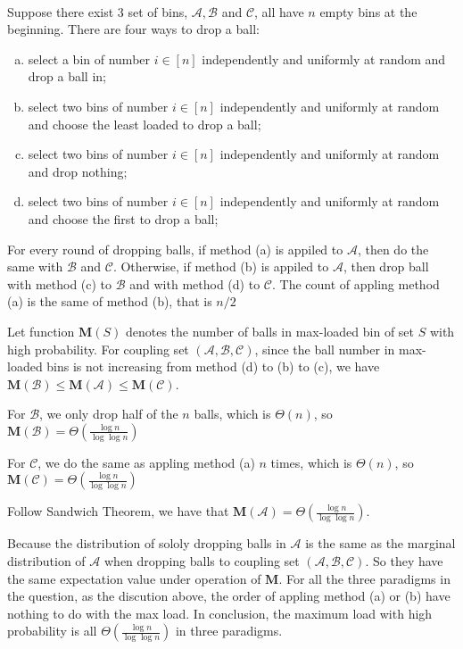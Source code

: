\documentclass[12pt]{article}
\newenvironment{solution}[2][Solution]{\begin{trivlist}
\item[\hskip \labelsep {\bfseries #1}\hskip \labelsep {\bfseries #2.}]}{\end{trivlist}}
\begin{document}
\begin{solution}{4}
    ~\\
    Suppose there exist 3 set of bins, $\mathcal{A}, \mathcal{B}$ and $\mathcal{C}$, all have $n$ empty bins at the beginning. There
    are four ways to drop a ball:
    \begin{enumerate}[(a)]
        \item select a bin of number $i \in [n]$ independently and uniformly at random and drop a ball in;
        \item select two bins of number $i \in [n]$ independently and uniformly at random and choose the least loaded to drop a ball;
        \item select two bins of number $i \in [n]$ independently and uniformly at random and drop nothing;
        \item select two bins of number $i \in [n]$ independently and uniformly at random and choose the first to drop a ball;
    \end{enumerate}

    For every round of dropping balls, if method (a) is appiled to $\mathcal{A}$, then do the same with $\mathcal{B}$ and $\mathcal{C}$.
    Otherwise, if method (b) is appiled to $\mathcal{A}$, then drop ball with method (c) to $\mathcal{B}$ and with method (d) to $\mathcal{C}$. 
    The count of appling method (a) is the same of method (b), that is $n/2$

    Let function $\mathbf{M}(S)$ denotes the number of balls in max-loaded bin of set $S$ with high probability.
    For coupling set $(\mathcal{A}, \mathcal{B}, \mathcal{C})$, since the ball number in max-loaded bins is not increasing from method
    (d) to (b) to (c), we have $\mathbf{M}(\mathcal{B}) \le \mathbf{M}(\mathcal{A}) \le \mathbf{M}(\mathcal{C})$.

    For $\mathcal{B}$, we only drop half of the $n$ balls, which is $\Theta(n)$, so $\mathbf{M}(\mathcal{B}) = \Theta(\frac{\log n}{\log \log n})$

    For $\mathcal{C}$, we do the same as appling method (a) $n$ times, which is $\Theta(n)$, so $\mathbf{M}(\mathcal{C}) = \Theta(\frac{\log n}{\log \log n})$

    Follow Sandwich Theorem, we have that $\mathbf{M}(\mathcal{A}) = \Theta(\frac{\log n}{\log \log n})$.

    Because the distribution of sololy dropping balls in $\mathcal{A}$ is the same as the marginal distribution of $\mathcal{A}$ when dropping
    balls to coupling set $(\mathcal{A}, \mathcal{B}, \mathcal{C})$. So they have the same expectation value under operation of $\mathbf{M}$.
    For all the three paradigms in the question, as the discution above, the order of appling method (a) or (b) have nothing to do with the max load.
    In conclusion, the maximum load with high probability is all $\Theta(\frac{\log n}{\log \log n})$ in three paradigms.
\end{solution}
\end{document}

